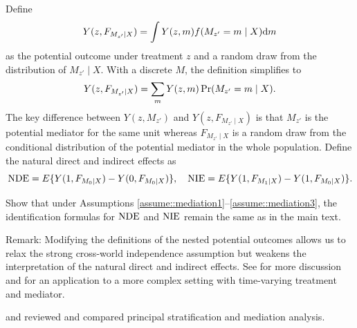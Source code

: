 \begin{HomeworkProblem}\label{exr:27-11}


Define
\[
Y(z, F_{M_{z'}\mid X}) = \int Y(z,m) f(M_{z'} = m\mid X) \textnormal{d} m
\]
as the potential outcome under treatment $z$ and a random draw from the distribution of $M_{z'}\mid X$.
With a discrete $M$, the definition simplifies to
\[
Y(z, F_{M_{z'}\mid X}) =\sum_m Y(z,m) \operatorname{Pr}(M_{z'} = m\mid X).
\]
The key difference between $Y(z,M_{z'})$ and $Y(z, F_{M_{z'}\mid X}) $ is that $M_{z'}$ is the potential mediator for the same unit whereas $F_{M_{z'}\mid X}$ is a random draw from the conditional distribution of the potential mediator in the whole population.
Define the natural direct and indirect effects as
\[
\mathrm{NDE} = E\{Y(1, F_{M_{0}\mid X})  - Y(0, F_{M_{0}\mid X})   \},\quad
\mathrm{NIE}  =  E\{Y(1, F_{M_{1}\mid X})  - Y(1, F_{M_{0}\mid X})   \}.
\]


Show that under Assumptions \ref{assume::mediation1}--\ref{assume::mediation3}, the identification formulas for $\mathrm{NDE}$ and $\mathrm{NIE}$ remain the same as in the main text.



Remark: Modifying the definitions of the nested potential outcomes allows us to relax the strong cross-world independence assumption but weakens the interpretation of the natural direct and indirect effects. See \citet{vanderweele2015explanation} for more discussion and \citet{vanderweele2017mediation} for an application to a more complex setting with time-varying treatment and mediator.



\end{HomeworkProblem}

\begin{HomeworkProblem}\label{exr:27-12}

\citet{vanderweele2008simple} and
\citet{forastiere2018principal} reviewed and compared principal stratification and mediation analysis.

\end{HomeworkProblem}
